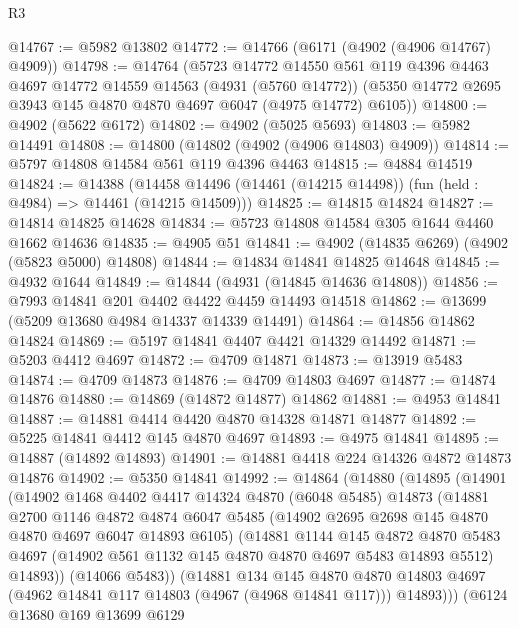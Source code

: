 \begin{lexlean}{R3}
\begin{coremodule}
@14767 := @5982 @13802
@14772 := @14766 (@6171 (@4902 (@4906 @14767) @4909))
@14798 := @14764
    (@5723
      @14772
      @14550
      @561
      @119
      @4396
      @4463
      @4697
      @14772
      @14559
      @14563
      (@4931 (@5760 @14772))
      (@5350 @14772 @2695 @3943 @145 @4870 @4870 @4697 @6047 (@4975 @14772) @6105))
@14800 := @4902 (@5622 @6172)
@14802 := @4902 (@5025 @5693)
@14803 := @5982 @14491
@14808 := @14800 (@14802 (@4902 (@4906 @14803) @4909))
@14814 := @5797 @14808 @14584 @561 @119 @4396 @4463
@14815 := @4884 @14519
@14824 := @14388
    (@14458 @14496 (@14461 (@14215 @14498)) (fun (held : @4984) => @14461 (@14215 @14509)))
@14825 := @14815 @14824
@14827 := @14814 @14825 @14628
@14834 := @5723 @14808 @14584 @305 @1644 @4460 @1662 @14636
@14835 := @4905 @51
@14841 := @4902 (@14835 @6269) (@4902 (@5823 @5000) @14808)
@14844 := @14834 @14841 @14825 @14648
@14845 := @4932 @1644
@14849 := @14844 (@4931 (@14845 @14636 @14808))
@14856 := @7993 @14841 @201 @4402 @4422 @4459 @14493 @14518
@14862 := @13699 (@5209 @13680 @4984 @14337 @14339 @14491)
@14864 := @14856 @14862 @14824
@14869 := @5197 @14841 @4407 @4421 @14329 @14492
@14871 := @5203 @4412 @4697
@14872 := @4709 @14871
@14873 := @13919 @5483
@14874 := @4709 @14873
@14876 := @4709 @14803 @4697
@14877 := @14874 @14876
@14880 := @14869 (@14872 @14877) @14862
@14881 := @4953 @14841
@14887 := @14881 @4414 @4420 @4870 @14328 @14871 @14877
@14892 := @5225 @14841 @4412 @145 @4870 @4697
@14893 := @4975 @14841
@14895 := @14887 (@14892 @14893)
@14901 := @14881 @4418 @224 @14326 @4872 @14873 @14876
@14902 := @5350 @14841
@14992 := @14864
    (@14880
      (@14895
        (@14901
          (@14902
            @1468
            @4402
            @4417
            @14324
            @4870
            (@6048 @5485)
            @14873
            (@14881
              @2700
              @1146
              @4872
              @4874
              @6047
              @5485
              (@14902 @2695 @2698 @145 @4870 @4870 @4697 @6047 @14893 @6105)
              (@14881
                @1144
                @145
                @4872
                @4870
                @5483
                @4697
                (@14902 @561 @1132 @145 @4870 @4870 @4697 @5483 @14893 @5512)
                @14893))
            (@14066 @5483))
          (@14881
            @134
            @145
            @4870
            @4870
            @14803
            @4697
            (@4962 @14841 @117 @14803 (@4967 (@4968 @14841 @117)))
            @14893)))
      (@6124
        @13680
        @169
        @13699
        @6129

\end{coremodule}
\end{lexlean}
